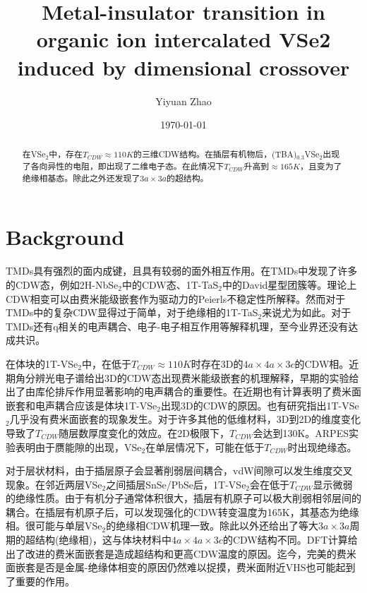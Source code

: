 \documentclass[reprint, aps, prb, showkeys, UTF8]{revtex4-2}
\begin{document}
\title{Metal-insulator transition in organic ion intercalated VSe2 \\
induced by dimensional crossover}

\author{Yiyuan Zhao}
\date{\today}

\begin{abstract}
在VSe$_2$中，存在$T_{CDW} \approx 110K$的三维CDW结构。在插层有机物后，(TBA)$_{0.3}$VSe$_2$出现了各向异性的电阻，即出现了二维电子态。在此情况下$T_{CDW}$升高到$\approx 165 K$，且变为了绝缘相基态。除此之外还发现了$3a \times 3a$的超结构。
\end{abstract}


\maketitle

\section{Background}
TMDs具有强烈的面内成键，且具有较弱的面外相互作用。在TMDs中发现了许多的CDW态，例如2H-NbSe$_2$中的CDW态、1T-TaS$_2$中的David星型团簇等。理论上CDW相变可以由费米能级嵌套作为驱动力的Peierls不稳定性所解释。然而对于TMDs中的复杂CDW显得过于简单，对于绝缘相的1T-TaS$_2$来说尤为如此。对于TMDs还有q相关的电声耦合、电子-电子相互作用等解释机理，至今业界还没有达成共识。

在体块的1T-VSe$_2$中，在低于$T_{CDW} \approx 110K$时存在3D的$4a \times 4a \times 3c$的CDW相。近期角分辨光电子谱给出3D的CDW态出现费米能级嵌套的机理解释，早期的实验给出了由库伦排斥作用显著影响的电声耦合的重要性。在近期也有计算表明了费米面嵌套和电声耦合应该是体块1T-VSe$_2$出现3D的CDW的原因。也有研究指出1T-VSe$_2$几乎没有费米面嵌套的现象发生。对于许多其他的低维材料，3D到2D的维度变化导致了$T_{CDW}$随层数厚度变化的效应。在2D极限下，$T_{CDW}$会达到130K。ARPES实验表明由于赝能隙的出现，VSe$_2$在单层情况下，可能在低于$T_{CDW}$时出现绝缘态。

对于层状材料，由于插层原子会显著削弱层间耦合，vdW间隙可以发生维度交叉现象。在邻近两层VSe$_2$之间插层SnSe/PbSe后，1T-VSe$_2$会在低于$T_{CDW}$显示微弱的绝缘性质。由于有机分子通常体积很大，插层有机原子可以极大削弱相邻层间的耦合。在插层有机原子后，可以发现强化的CDW转变温度为165K，其基态为绝缘相。很可能与单层VSe$_2$的绝缘相CDW机理一致。除此以外还给出了等大$3a \times 3a$周期的超结构(绝缘相)，这与体块材料中$4a \times 4a \times 3c$的CDW结构不同。DFT计算给出了改进的费米面嵌套是造成超结构和更高CDW温度的原因。迄今，完美的费米面嵌套是否是金属-绝缘体相变的原因仍然难以捉摸，费米面附近VHS也可能起到了重要的作用。
\end{document}

